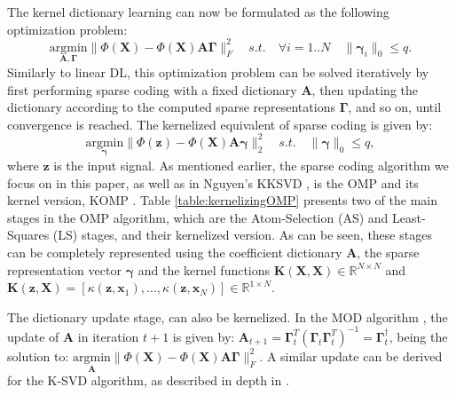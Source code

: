 \documentclass[journal]{IEEEtran}
\newcommand{\bx}{\mathbf{x}}
\newcommand{\bz}{\mathbf{z}}
\newcommand{\bX}{\mathbf{X}}
\newcommand{\bK}{\mathbf{K}}
\newcommand{\bA}{\mathbf{A}}
\newcommand{\bGamma}{\boldsymbol{\Gamma}}
\newcommand{\bgamma}{\boldsymbol{\gamma}}
\begin{document}
The kernel dictionary learning can now be formulated as the following optimization problem:
\begin{equation}\label{eq:ChellapaKDL}
    \underset{\mathbf{A},\bGamma}{\text{argmin}} \| \Phi(\bX) - \Phi(\bX) \mathbf{A} \bGamma \|_F^2  \quad s.t. \quad \forall i=1..N \quad \| \bgamma_i \|_0 \leq \mathit{q}.
\end{equation}
Similarly to linear DL, this optimization problem can be solved iteratively by first performing sparse coding with a fixed dictionary $\bA$, then updating the dictionary according to the computed sparse representations $\bGamma$, and so on, until convergence is reached. The kernelized equivalent of sparse coding is given by: \begin{equation}\label{eq:KernelSparseCoding}
    \underset{\bgamma}{\text{argmin}} \| \Phi(\bz) - \Phi(\bX) \mathbf{A} \bgamma \|_2^2 \quad s.t. \quad \| \bgamma \|_0 \leq \mathit{q},
\end{equation}
where $\bz$ is the input signal. As mentioned earlier, the sparse coding algorithm we focus on in this paper, as well as in Nguyen's KKSVD \cite{KDL}, is the OMP \cite{OMP} and its kernel version, KOMP \cite{KDL}. Table \ref{table:kernelizingOMP} presents two of the main stages in the OMP algorithm, which are the Atom-Selection (AS) and Least-Squares (LS) stages, and their kernelized version. As can be seen, these stages can be completely represented using the coefficient dictionary $\bA$, the sparse representation vector $\bgamma$ and the kernel functions $\bK(\bX,\bX)\in \mathbb{R}^{N \times N}$ and $\bK(\bz,\bX) = [\kappa(\bz,\bx_1),\ldots,\kappa(\bz,\bx_N)] \in \mathbb{R}^{1 \times N}$.

The dictionary update stage, can also be kernelized. In the MOD algorithm \cite{MOD}, the update of $\bA$ in iteration $t+1$ is given by: $\bA_{t+1}=\bGamma_t^T(\bGamma_t\bGamma_t^T)^{-1}=\bGamma_t^{\dagger}$, being the solution to: $\underset{\bA}{\text{argmin}}\| \Phi(\bX) - \Phi(\bX)\bA\bGamma \|_F^2$. A similar update can be derived for the K-SVD algorithm, as described in depth in \cite{KDL,KDL2}.
\end{document}
